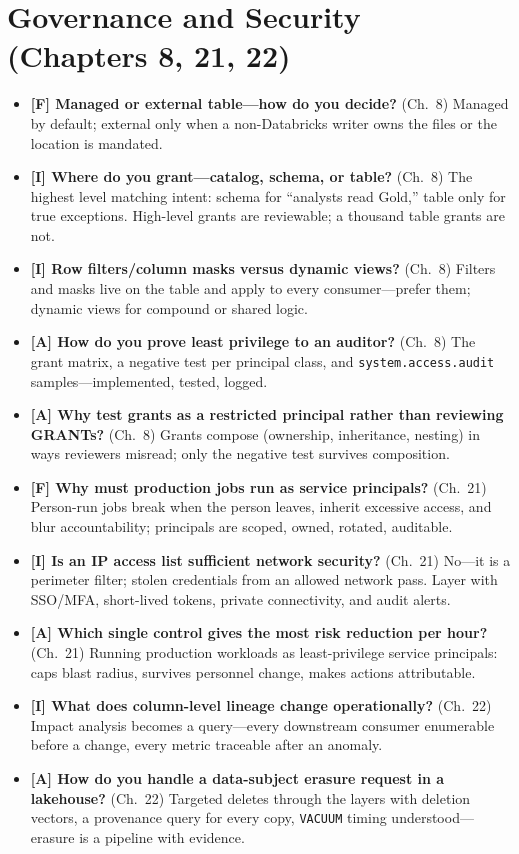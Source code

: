 \section{Governance and Security (Chapters 8, 21, 22)}
%
\begin{itemize}
    \item \textbf{[F] Managed or external table---how do you decide?} (Ch.~8) Managed by
    default; external only when a non-Databricks writer owns the files or the location is
    mandated.
    \item \textbf{[I] Where do you grant---catalog, schema, or table?} (Ch.~8) The highest
    level matching intent: schema for ``analysts read Gold,'' table only for true exceptions.
    High-level grants are reviewable; a thousand table grants are not.
    \item \textbf{[I] Row filters/column masks versus dynamic views?} (Ch.~8) Filters and
    masks live on the table and apply to every consumer---prefer them; dynamic views for
    compound or shared logic.
    \item \textbf{[A] How do you prove least privilege to an auditor?} (Ch.~8) The grant
    matrix, a negative test per principal class, and \texttt{system.access.audit}
    samples---implemented, tested, logged.
    \item \textbf{[A] Why test grants as a restricted principal rather than reviewing GRANTs?}
    (Ch.~8) Grants compose (ownership, inheritance, nesting) in ways reviewers misread; only
    the negative test survives composition.
    \item \textbf{[F] Why must production jobs run as service principals?} (Ch.~21) Person-run
    jobs break when the person leaves, inherit excessive access, and blur accountability;
    principals are scoped, owned, rotated, auditable.
    \item \textbf{[I] Is an IP access list sufficient network security?} (Ch.~21) No---it is a
    perimeter filter; stolen credentials from an allowed network pass. Layer with SSO/MFA,
    short-lived tokens, private connectivity, and audit alerts.
    \item \textbf{[A] Which single control gives the most risk reduction per hour?} (Ch.~21)
    Running production workloads as least-privilege service principals: caps blast radius,
    survives personnel change, makes actions attributable.
    \item \textbf{[I] What does column-level lineage change operationally?} (Ch.~22) Impact
    analysis becomes a query---every downstream consumer enumerable before a change, every
    metric traceable after an anomaly.
    \item \textbf{[A] How do you handle a data-subject erasure request in a lakehouse?}
    (Ch.~22) Targeted deletes through the layers with deletion vectors, a provenance query for
    every copy, \texttt{VACUUM} timing understood---erasure is a pipeline with evidence.
\end{itemize}

